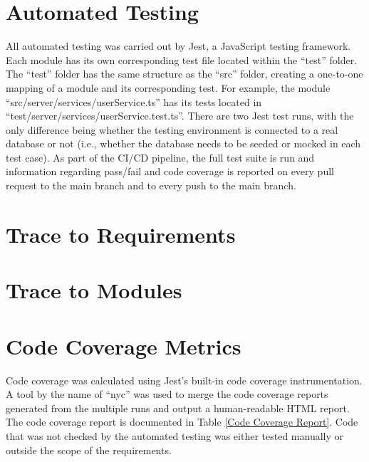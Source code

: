 \documentclass[12pt, titlepage]{article}
\begin{document}

\section{Automated Testing}

All automated testing was carried out by Jest, a JavaScript testing framework. Each module has its
own corresponding test file located within the ``test'' folder. The ``test'' folder has the same
structure as the ``src'' folder, creating a one-to-one mapping of a module and its corresponding
test. For example, the module ``src/server/services/userService.ts'' has its tests located in
``test/server/services/userService.test.ts''. There are two Jest test runs, with the only
difference being whether the testing environment is connected to a real database or not (i.e.,
whether the database needs to be seeded or mocked in each test case). As part of the CI/CD
pipeline, the full test suite is run and information regarding pass/fail and code coverage is
reported on every pull request to the main branch and to every push to the main branch.

\section{Trace to Requirements}

\section{Trace to Modules}

\section{Code Coverage Metrics}

Code coverage was calculated using Jest's built-in code coverage instrumentation. A tool by the
name of ``nyc'' was used to merge the code coverage reports generated from the multiple runs and
output a human-readable HTML report. The code coverage report is documented in Table \ref{Code
	Coverage Report}. Code that was not checked by the automated testing was either tested manually or
outside the scope of the requirements.
\end{document}
